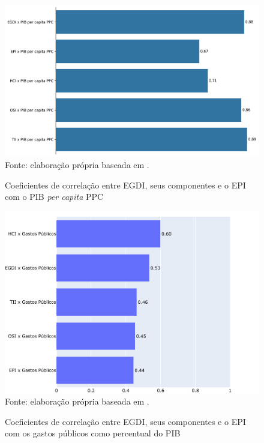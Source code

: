 \begin{figure}[H]
	\centering
	\caption{Coeficientes de correlação entre EGDI, seus componentes e o EPI com o PIB \textit{per capita} PPC}
	\includegraphics[width=1\linewidth]{figuras/correlacao_egdi_pibpercapitapcc.png}
	\label{fig:correlacao_egdi_pibpercapitapcc}
	\footnotesize{Fonte: elaboração própria baseada em \cite{WB_pib_per_capita_países}.}
\end{figure}

\begin{figure}[H]
	\centering
	\caption{Coeficientes de correlação entre EGDI, seus componentes e o EPI com os gastos públicos como percentual do PIB}
    \includegraphics[width=1\linewidth]{figuras/correlacao_egdi_gastospublicos.png}
	\label{fig:correlacao_egdi_gastospublicos}
	\footnotesize{Fonte: elaboração própria baseada em \cite{FMI_gov_expenditure}.}
\end{figure}

